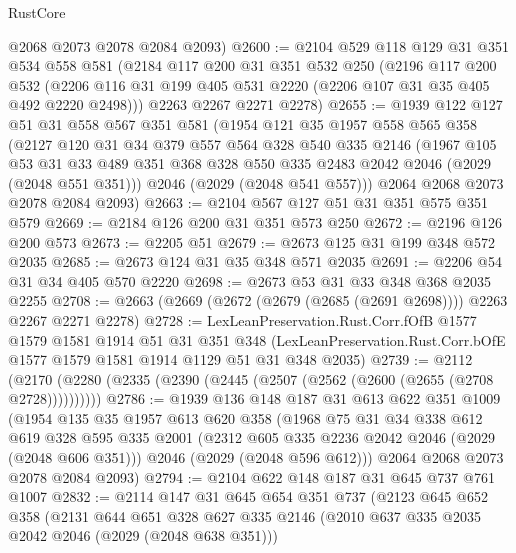 \begin{lexlean}{RustCore}
\begin{coremodule}
      @2068
      @2073
      @2078
      @2084
      @2093)
@2600 := @2104
    @529
    @118
    @129
    @31
    @351
    @534
    @558
    @581
    (@2184
      @117
      @200
      @31
      @351
      @532
      @250
      (@2196
        @117
        @200
        @532
        (@2206 @116 @31 @199 @405 @531 @2220 (@2206 @107 @31 @35 @405 @492 @2220 @2498)))
      @2263
      @2267
      @2271
      @2278)
@2655 := @1939
    @122
    @127
    @51
    @31
    @558
    @567
    @351
    @581
    (@1954
      @121
      @35
      @1957
      @558
      @565
      @358
      (@2127
        @120
        @31
        @34
        @379
        @557
        @564
        @328
        @540
        @335
        @2146
        (@1967
          @105
          @53
          @31
          @33
          @489
          @351
          @368
          @328
          @550
          @335
          @2483
          @2042
          @2046
          (@2029 (@2048 @551 @351)))
        @2046
        (@2029 (@2048 @541 @557)))
      @2064
      @2068
      @2073
      @2078
      @2084
      @2093)
@2663 := @2104 @567 @127 @51 @31 @351 @575 @351 @579
@2669 := @2184 @126 @200 @31 @351 @573 @250
@2672 := @2196 @126 @200 @573
@2673 := @2205 @51
@2679 := @2673 @125 @31 @199 @348 @572 @2035
@2685 := @2673 @124 @31 @35 @348 @571 @2035
@2691 := @2206 @54 @31 @34 @405 @570 @2220
@2698 := @2673 @53 @31 @33 @348 @368 @2035 @2255
@2708 := @2663 (@2669 (@2672 (@2679 (@2685 (@2691 @2698)))) @2263 @2267 @2271 @2278)
@2728 := LexLeanPreservation.Rust.Corr.fOfB
    @1577
    @1579
    @1581
    @1914
    @51
    @31
    @351
    @348
    (LexLeanPreservation.Rust.Corr.bOfE @1577 @1579 @1581 @1914 @1129 @51 @31 @348 @2035)
@2739 := @2112 (@2170 (@2280 (@2335 (@2390 (@2445 (@2507 (@2562 (@2600 (@2655 (@2708 @2728))))))))))
@2786 := @1939
    @136
    @148
    @187
    @31
    @613
    @622
    @351
    @1009
    (@1954
      @135
      @35
      @1957
      @613
      @620
      @358
      (@1968
        @75
        @31
        @34
        @338
        @612
        @619
        @328
        @595
        @335
        @2001
        (@2312 @605 @335 @2236 @2042 @2046 (@2029 (@2048 @606 @351)))
        @2046
        (@2029 (@2048 @596 @612)))
      @2064
      @2068
      @2073
      @2078
      @2084
      @2093)
@2794 := @2104 @622 @148 @187 @31 @645 @737 @761 @1007
@2832 := @2114
    @147
    @31
    @645
    @654
    @351
    @737
    (@2123
      @645
      @652
      @358
      (@2131
        @644
        @651
        @328
        @627
        @335
        @2146
        (@2010 @637 @335 @2035 @2042 @2046 (@2029 (@2048 @638 @351)))

\end{coremodule}
\end{lexlean}
